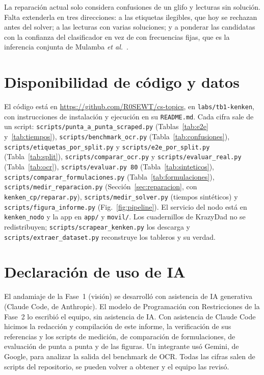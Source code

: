 \documentclass[conference]{IEEEtran}
\begin{document}
La reparación actual solo considera confusiones de un glifo y lecturas sin solución. Falta extenderla en tres direcciones: a las etiquetas ilegibles, que hoy se rechazan antes del solver; a las lecturas con varias soluciones; y a ponderar las candidatas con la confianza del clasificador en vez de con frecuencias fijas, que es la inferencia conjunta de Mulamba \textit{et al.}~\cite{mulamba2024}.

\section*{Disponibilidad de código y datos}
\begin{sloppypar}
El código está en \url{https://github.com/R0SEWT/cs-topics}, en \texttt{labs/tb1-kenken}, con instrucciones de instalación y ejecución en su \texttt{README.md}. Cada cifra sale de un script: \texttt{scripts/punta\_a\_punta\_scraped.py} (Tablas~\ref{tab:e2e} y~\ref{tab:tiempos}), \texttt{scripts/benchmark\_ocr.py} (Tabla~\ref{tab:confusiones}), \texttt{scripts/etiquetas\_por\_split.py} y \texttt{scripts/e2e\_por\_split.py} (Tabla~\ref{tab:split}), \texttt{scripts/comparar\_ocr.py} y \texttt{scripts/evaluar\_real.py} (Tabla~\ref{tab:ocr}), \texttt{scripts/evaluar.py 80} (Tabla~\ref{tab:sinteticos}), \texttt{scripts/comparar\_formulaciones.py} (Tabla~\ref{tab:formulaciones}), \texttt{scripts/medir\_reparacion.py} (Sección~\ref{sec:reparacion}, con \texttt{kenken\_cp/reparar.py}), \texttt{scripts/medir\_solver.py} (tiempos sintéticos) y \texttt{scripts/figura\_informe.py} (Fig.~\ref{fig:pipeline}). El servicio del nodo está en \texttt{kenken\_nodo} y la app en \texttt{app/} y \texttt{movil/}. Los cuadernillos de KrazyDad no se redistribuyen; \texttt{scripts/scrapear\_kenken.py} los descarga y \texttt{scripts/extraer\_dataset.py} reconstruye los tableros y su verdad.
\end{sloppypar}

\section*{Declaración de uso de IA}
El andamiaje de la Fase~1 (visión) se desarrolló con asistencia de IA generativa (Claude Code, de Anthropic). El modelo de Programación con Restricciones de la Fase~2 lo escribió el equipo, sin asistencia de IA. Con asistencia de Claude Code hicimos la redacción y compilación de este informe, la verificación de sus referencias y los scripts de medición, de comparación de formulaciones, de evaluación de punta a punta y de las figuras. Un integrante usó Gemini, de Google, para analizar la salida del benchmark de OCR. Todas las cifras salen de scripts del repositorio, se pueden volver a obtener y el equipo las revisó.
\end{document}
